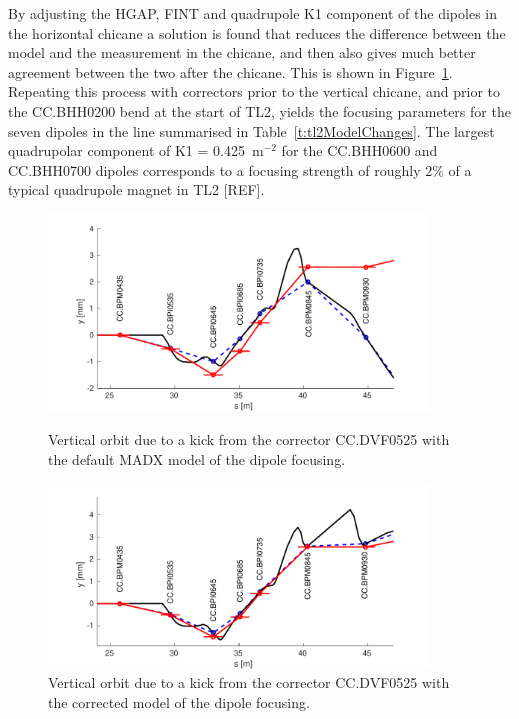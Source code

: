By adjusting the HGAP, FINT and quadrupole K1 component of the dipoles in the horizontal chicane a solution is found that reduces the difference between the model and the measurement in the chicane, and then also gives much better agreement between the two after the chicane. This is shown in Figure~\ref{f:modelCorrBendV}. Repeating this process with correctors prior to the vertical chicane, and prior to the CC.BHH0200 bend at the start of TL2, yields the focusing parameters for the seven dipoles in the line summarised in Table~\ref{t:tl2ModelChanges}. The largest quadrupolar component of K1 = 0.425~\(\mathrm{m^{-2}}\) for the CC.BHH0600 and CC.BHH0700 dipoles corresponds to a focusing strength of roughly \(2\%\) of a typical quadrupole magnet in TL2 [REF].

\begin{figure}
  \centering
  \includegraphics[width=0.9\textwidth]{Figures/optics/modelOrigBendV}
  \caption{Vertical orbit due to a kick from the corrector CC.DVF0525 with the default MADX  model of the dipole focusing.}
  \label{f:modelOrigBendV}
  \includegraphics[width=0.9\textwidth]{Figures/optics/modelCorrBendV}
  \caption{Vertical orbit due to a kick from the corrector CC.DVF0525 with the corrected model of the dipole focusing.}
  \label{f:modelCorrBendV}
\end{figure}


